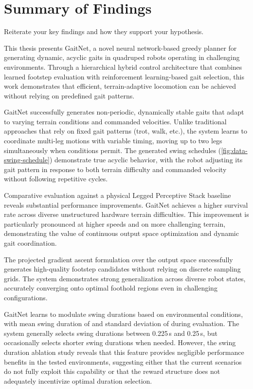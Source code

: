 \section{Summary of Findings}
\label{sec:conclusions-summary-of-findings}

\begin{outline}
  Reiterate your key findings and how they support your hypothesis.
\end{outline}

This thesis presents GaitNet, a novel neural network-based greedy
planner for generating dynamic, acyclic gaits in quadruped robots
operating in challenging environments. Through a hierarchical hybrid
control architecture that combines learned footstep evaluation with
reinforcement learning-based gait selection, this work demonstrates
that efficient, terrain-adaptive locomotion can be achieved without
relying on predefined gait patterns.

GaitNet successfully generates non-periodic, dynamically stable gaits
that adapt to varying terrain conditions and commanded velocities.
Unlike traditional approaches that rely on fixed gait patterns (trot,
walk, etc.), the system learns to coordinate multi-leg motions with
variable timing, moving up to two legs simultaneously when conditions
permit. The generated swing schedules
(\autoref{fig:data-swing-schedule}) demonstrate true acyclic
behavior, with the robot adjusting its gait pattern in response to
both terrain difficulty and commanded velocity without following
repetitive cycles.

Comparative evaluation against a physical Legged Perceptive Stack baseline
reveals substantial performance improvements. GaitNet achieves a higher
survival rate across diverse unstructured hardware terrain difficulties. This improvement
is particularly pronounced at higher speeds and on more challenging
terrain, demonstrating the value of continuous output space optimization 
and dynamic gait coordination. 

The projected gradient ascent formulation over the output space
successfully generates high-quality footstep candidates without relying 
on discrete sampling grids. The system demonstrates strong generalization 
across diverse robot states, accurately converging onto optimal foothold regions 
even in challenging configurations.

GaitNet learns to modulate swing durations based on environmental
conditions, with mean swing duration of
\resGaitNetMeanSwingDuration{} and standard deviation of
\resGaitNetSTDSwingDuration{} during evaluation. The system generally
selects swing durations between 0.225\,s and 0.25\,s, but
occasionally selects shorter swing durations when needed. However,
the swing duration ablation study reveals that this feature provides
negligible performance benefits in the tested environments, suggesting 
either that the current
scenarios do not fully exploit this capability or that the reward
structure does not adequately incentivize optimal duration selection.

